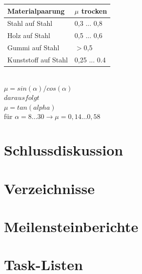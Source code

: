 \documentclass[a4paper]{report}
\begin{document}
\begin{tabular}{|p{}|p{}|}
	\hline
	\textbf{Materialpaarung} & \textbf{$\mu$ trocken}\\
	\hline
	Stahl auf Stahl & 0,3 ... 0,8 \\
	\hline
	Holz auf Stahl & 0,5 ... 0,6\\
	\hline
	Gummi auf Stahl & $>$0,5 \\
	\hline
	Kunststoff auf Stahl & 0,25 ... 0.4\\
	\hline
\end{tabular}	\\
	$\mu=sin(\alpha)/cos(\alpha) $\\
	$daraus folgt $\\
	$\mu=tan(alpha)$\\
	für $\alpha=8 ... 30 \rightarrow \mu = 0,14 ... 0,58$ \\

\chapter{Schlussdiskussion}

\chapter*{Verzeichnisse}

\listoffigures

\listoftables

\printbibliography

\appendix

\chapter{Meilensteinberichte}

\chapter{Task-Listen}
\end{document}

